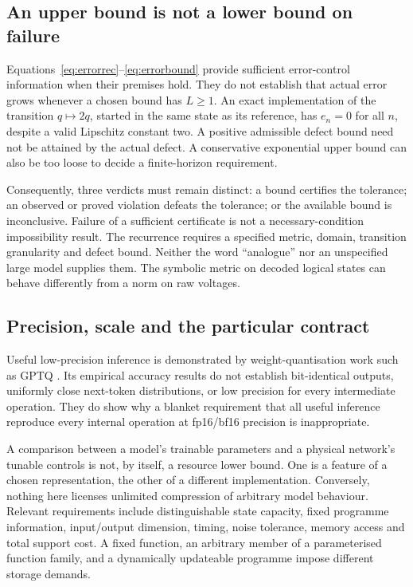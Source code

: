 \documentclass[11pt,a4paper]{article}
\theoremstyle{definition}
\theoremstyle{remark}
\begin{document}
\subsection{An upper bound is not a lower bound on failure}\label{subsec:bounddirection}
Equations~\eqref{eq:errorrec}--\eqref{eq:errorbound} provide sufficient error-control information when their premises hold. They do not establish that actual error grows whenever a chosen bound has $L\geq1$. An exact implementation of the transition $q\mapsto2q$, started in the same state as its reference, has $e_n=0$ for all $n$, despite a valid Lipschitz constant two. A positive admissible defect bound need not be attained by the actual defect. A conservative exponential upper bound can also be too loose to decide a finite-horizon requirement.

Consequently, three verdicts must remain distinct: a bound certifies the tolerance; an observed or proved violation defeats the tolerance; or the available bound is inconclusive. Failure of a sufficient certificate is not a necessary-condition impossibility result. The recurrence requires a specified metric, domain, transition granularity and defect bound. Neither the word ``analogue'' nor an unspecified large model supplies them. The symbolic metric on decoded logical states can behave differently from a norm on raw voltages.

\subsection{Precision, scale and the particular contract}
Useful low-precision inference is demonstrated by weight-quantisation work such as GPTQ \citep{gptq}. Its empirical accuracy results do not establish bit-identical outputs, uniformly close next-token distributions, or low precision for every intermediate operation. They do show why a blanket requirement that all useful inference reproduce every internal operation at fp16/bf16 precision is inappropriate.

A comparison between a model's trainable parameters and a physical network's tunable controls is not, by itself, a resource lower bound. One is a feature of a chosen representation, the other of a different implementation. Conversely, nothing here licenses unlimited compression of arbitrary model behaviour. Relevant requirements include distinguishable state capacity, fixed programme information, input/output dimension, timing, noise tolerance, memory access and total support cost. A fixed function, an arbitrary member of a parameterised function family, and a dynamically updateable programme impose different storage demands.
\end{document}

